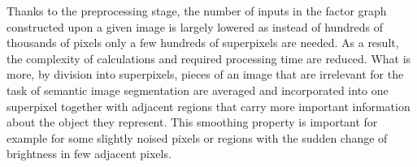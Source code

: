 Thanks to the preprocessing stage, the number of inputs in the factor graph constructed upon a given image is largely lowered as instead of hundreds of thousands of pixels only a few hundreds of superpixels are needed. As a result, the complexity of calculations and required processing time are reduced. What is more, by division into superpixels, pieces of an image that are irrelevant for the task of semantic image segmentation are averaged and incorporated into one superpixel together with adjacent regions that carry more important information about the object they represent. This smoothing property is important for example for some slightly noised pixels or regions with the sudden change of brightness in few adjacent pixels.